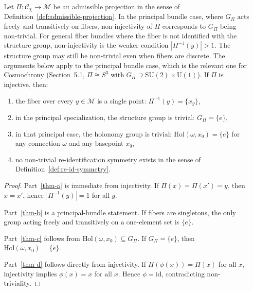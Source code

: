     \begin{theorem}
      \label{thm:injective-trivial-holonomy}
      Let $\Pi : \mathcal{C}_\chi \to \mathcal{M}$ be an admissible projection in the sense of
      Definition~\ref{def:admissible-projection}.
      In the principal bundle case, where $G_\Pi$ acts freely and transitively on fibers,
      non-injectivity of $\Pi$ corresponds to $G_\Pi$ being non-trivial.
      For general fiber bundles where the fiber is not identified with the structure group,
      non-injectivity is the weaker condition $|\Pi^{-1}(y)| > 1$.
      The structure group may still be non-trivial even when fibers are discrete.
      The arguments below apply to the principal bundle case, which is the relevant one
      for Cosmochrony (Section~5.1, $\Pi \cong S^3$ with
      $G_\Pi \supseteq \mathrm{SU}(2) \times \mathrm{U}(1)$).
      If $\Pi$ is injective, then:
      \begin{enumerate}[label=(\alph*)]
  \item \label{thm-a}
  the fiber over every $y \in \mathcal{M}$ is a single point: $\Pi^{-1}(y) = \{x_y\}$,
  \item \label{thm-b}
  in the principal specialization, the structure group is trivial: $G_\Pi = \{e\}$,
  \item \label{thm-c}
  in that principal case, the holonomy group is trivial:
  $\mathrm{Hol}(\omega, x_0) = \{e\}$ for any connection $\omega$ and any basepoint $x_0$,
  \item \label{thm-d}
  no non-trivial re-identification symmetry exists in the sense of Definition~\ref{def:re-id-symmetry}.
      \end{enumerate}
    \end{theorem}

    \begin{proof}
      Part~\ref{thm-a} is immediate from injectivity.
      If $\Pi(x) = \Pi(x') = y$, then $x = x'$, hence $|\Pi^{-1}(y)| = 1$ for all $y$.

      Part~\ref{thm-b} is a principal-bundle statement.
      If fibers are singletons, the only group acting freely and transitively on a one-element set is $\{e\}$.

      Part~\ref{thm-c} follows from $\mathrm{Hol}(\omega, x_0) \subseteq G_\Pi$.
      If $G_\Pi = \{e\}$, then $\mathrm{Hol}(\omega, x_0) = \{e\}$.

      Part~\ref{thm-d} follows directly from injectivity.
      If $\Pi(\phi(x)) = \Pi(x)$ for all $x$, injectivity implies $\phi(x) = x$ for all $x$.
      Hence $\phi = \mathrm{id}$, contradicting non-triviality.
    \end{proof}

